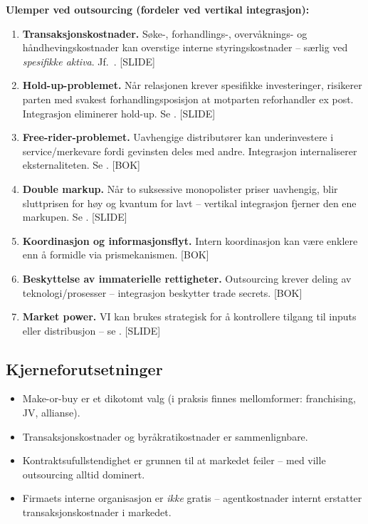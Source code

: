 \textbf{Ulemper ved outsourcing (fordeler ved vertikal integrasjon):}
\begin{enumerate}\setlength{\itemsep}{2pt}
\item \textbf{Transaksjonskostnader.} Søke-, forhandlings-, overvåknings- og håndhevingskostnader kan overstige interne styringskostnader -- særlig ved \emph{spesifikke aktiva}. Jf.\ . [SLIDE]
\item \textbf{Hold-up-problemet.} Når relasjonen krever spesifikke investeringer, risikerer parten med svakest forhandlingsposisjon at motparten reforhandler ex post. Integrasjon eliminerer hold-up. Se . [SLIDE]
\item \textbf{Free-rider-problemet.} Uavhengige distributører kan underinvestere i service/merkevare fordi gevinsten deles med andre. Integrasjon internaliserer eksternaliteten. Se . [BOK]
\item \textbf{Double markup.} Når to suksessive monopolister priser uavhengig, blir sluttprisen for høy og kvantum for lavt -- vertikal integrasjon fjerner den ene markupen. Se . [SLIDE]
\item \textbf{Koordinasjon og informasjonsflyt.} Intern koordinasjon kan være enklere enn å formidle  via prismekanismen. [BOK]
\item \textbf{Beskyttelse av immaterielle rettigheter.} Outsourcing krever deling av teknologi/prosesser -- integrasjon beskytter trade secrets. [BOK]
\item \textbf{Market power.} VI kan brukes strategisk for å kontrollere tilgang til inputs eller distribusjon -- se . [SLIDE]
\end{enumerate}

\subsection*{Kjerneforutsetninger}
\begin{itemize}
\item Make-or-buy er et dikotomt valg (i praksis finnes mellomformer: franchising, JV, allianse).
\item Transaksjonskostnader og byråkratikostnader er sammenlignbare.
\item Kontraktsufullstendighet er grunnen til at markedet feiler -- med  ville outsourcing alltid dominert.
\item Firmaets interne organisasjon er \emph{ikke} gratis -- agentkostnader internt erstatter transaksjonskostnader i markedet.
\end{itemize}

